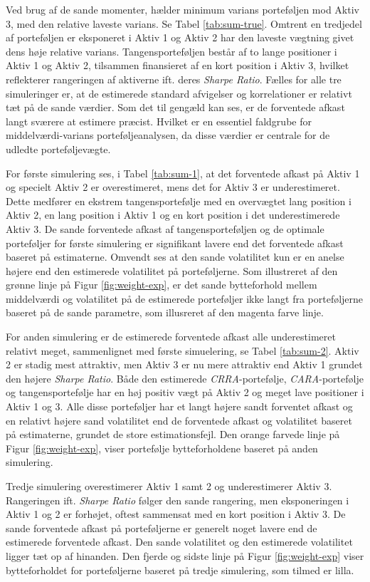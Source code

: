 \documentclass[
  a4paper,
  oneside]{memoir}
\begin{document}
Ved brug af de sande momenter, hælder minimum varians porteføljen mod Aktiv 3, med den relative laveste varians. Se Tabel \ref{tab:sum-true}. Omtrent en tredjedel af porteføljen er eksponeret i Aktiv 1 og Aktiv 2 har den laveste vægtning givet dens høje relative varians. Tangensporteføljen består af to lange positioner i Aktiv 1 og Aktiv 2, tilsammen finansieret af en kort position i Aktiv 3, hvilket reflekterer rangeringen af aktiverne ift. deres \emph{Sharpe Ratio}.
Fælles for alle tre simuleringer er, at de estimerede standard afvigelser og korrelationer er relativt tæt på de sande værdier. Som det til gengæld kan ses, er de forventede afkast langt sværere at estimere præcist. Hvilket er en essentiel faldgrube for middelværdi-varians porteføljeanalysen, da disse værdier er centrale for de udledte porteføljevægte.

For første simulering ses, i Tabel \ref{tab:sum-1}, at det forventede afkast på Aktiv 1 og specielt Aktiv 2 er overestimeret, mens det for Aktiv 3 er underestimeret. Dette medfører en ekstrem tangensportefølje med en overvægtet lang position i Aktiv 2, en lang position i Aktiv 1 og en kort position i det underestimerede Aktiv 3. De sande forventede afkast af tangensporteføljen og de optimale porteføljer for første simulering er signifikant lavere end det forventede afkast baseret på estimaterne. Omvendt ses at den sande volatilitet kun er en anelse højere end den estimerede volatilitet på porteføljerne. Som illustreret af den grønne linje på Figur \ref{fig:weight-exp}, er det sande bytteforhold mellem middelværdi og volatilitet på de estimerede porteføljer ikke langt fra porteføljerne baseret på de sande parametre, som illusreret af den magenta farve linje.

For anden simulering er de estimerede forventede afkast alle underestimeret relativt meget, sammenlignet med første simuelering, se Tabel \ref{tab:sum-2}. Aktiv 2 er stadig mest attraktiv, men Aktiv 3 er nu mere attraktiv end Aktiv 1 grundet den højere \emph{Sharpe Ratio}. Både den estimerede \emph{CRRA}-portefølje, \emph{CARA}-portefølje og tangensportefølje har en høj positiv vægt på Aktiv 2 og meget lave positioner i Aktiv 1 og 3. Alle disse porteføljer har et langt højere sandt forventet afkast og en relativt højere sand volatilitet end de forventede afkast og volatilitet baseret på estimaterne, grundet de store estimationsfejl. Den orange farvede linje på Figur \ref{fig:weight-exp}, viser portefølje bytteforholdene baseret på anden simulering.

Tredje simulering overestimerer Aktiv 1 samt 2 og underestimerer Aktiv 3. Rangeringen ift. \emph{Sharpe Ratio} følger den sande rangering, men eksponeringen i Aktiv 1 og 2 er forhøjet, oftest sammensat med en kort position i Aktiv 3. De sande forventede afkast på porteføljerne er generelt noget lavere end de estimerede forventede afkast. Den sande volatilitet og den estimerede volatilitet ligger tæt op af hinanden. Den fjerde og sidste linje på Figur \ref{fig:weight-exp} viser bytteforholdet for porteføljerne baseret på tredje simulering, som tilmed er lilla.
\end{document}

